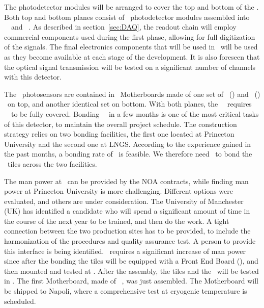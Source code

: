 The photodetector modules will be arranged to cover the top and bottom of the \TPC. Both top and bottom planes consist of \DSpPdmsHalfNumber\ photodetector modules assembled into \DSpSQBsNumber\ \SQBs\ and \DSpTRBsNumber\ \TRBs. As described in section~\ref{sec:DAQ}, the readout chain will employ commercial components used during the first phase, allowing for full digitization of the signals.  The final electronics components that will be used in \DSks\ will be used as they become available at each stage of the development. It is also foreseen that the optical signal transmission will be tested on a significant number of channels with this detector.

The \DSps\ photosensors are contained in \DSpMBNumber\ Motherboards made of one set of \DSpSQBsNumber\  (\SQB) and \DSpTRBsNumber\  (\TRB) \DSkPdms\ on top, and another identical set on bottom.  With both planes, the \DSps\ \TPC\ requires \DSpPdmsNumber\ \DSkPdm\ to be fully covered. Bonding \DSpSipmsNumber\ \SiPMs\ in a few months is one of the most critical tasks of this detector, to maintain the overall project schedule. %
The construction strategy relies on two bonding facilities, the first one located at Princeton University and the second one at LNGS. According to the experience gained in the past months, a bonding rate of \DSpSipmsBondingRate\ is feasible.  We therefore need \DSpSipmsBondingTime\ to bond the \DSpPdmsNumber\ tiles across the two facilities.

The man power at \LNGS\ can be provided by the NOA contracts, while finding man power at Princeton University is more challenging. Different options were evaluated, and others are under consideration. The University of Manchester (UK) has identified a candidate who will spend a significant amount of time in the course of the next year to be trained, and then do the work.  A tight connection between the two production sites has to be provided, to include the harmonization of the procedures and quality assurance test. A person to provide this interface is being identified.  \LNGS\ requires a significant increase of man power since after the bonding the tiles will be equipped with a Front End Board (\FEB), and then mounted and tested at \LNGS. After the assembly, the tiles and the \FEB\ will be tested in \LIN.  The first Motherboard, made of \DSkSQBPdmsNumber\ \DSkPdms, was just assembled.  The Motherboard will be shipped to Napoli, where a comprehensive test at cryogenic temperature is scheduled.


